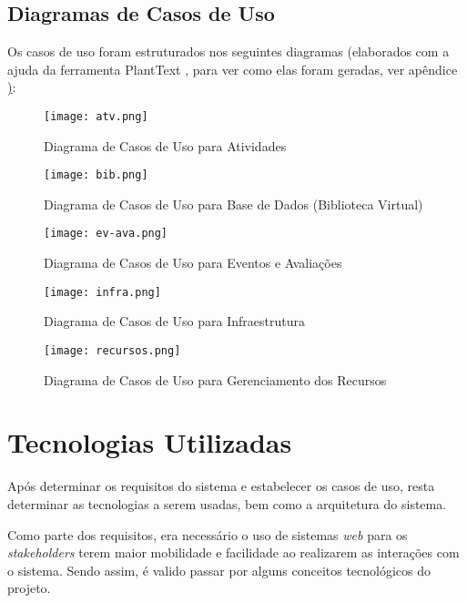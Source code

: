 \subsection{Diagramas de Casos de Uso}
Os casos de uso foram estruturados nos seguintes diagramas (elaborados com a ajuda da ferramenta PlantText \cite{planttext2018}, para ver como elas foram geradas, ver apêndice \href{chap:use-case-appendix}):

\begin{figure}[H]
    \centering
    \texttt{[image: atv.png]}
    \caption{Diagrama de Casos de Uso para Atividades}
    \label{fig:use-case-atv}
\end{figure}

\begin{figure}[H]
    \centering
    \texttt{[image: bib.png]}
    \caption{Diagrama de Casos de Uso para Base de Dados (Biblioteca Virtual)}
    \label{fig:use-case-atv}
\end{figure}

\begin{figure}[H]
    \centering
    \texttt{[image: ev-ava.png]}
    \caption{Diagrama de Casos de Uso para Eventos e Avaliações}
    \label{fig:use-case-atv}
\end{figure}

\begin{figure}[H]
    \centering
    \texttt{[image: infra.png]}
    \caption{Diagrama de Casos de Uso para Infraestrutura}
    \label{fig:use-case-atv}
\end{figure}

\begin{figure}[H]
    \centering
    \texttt{[image: recursos.png]}
    \caption{Diagrama de Casos de Uso para Gerenciamento dos Recursos}
    \label{fig:use-case-atv}
\end{figure}

\section{Tecnologias Utilizadas}
Após determinar os requisitos do sistema e estabelecer os casos de uso, resta determinar as tecnologias a serem usadas, bem como a arquitetura do sistema.

Como parte dos requisitos, era necessário o uso de sistemas \textit{web} para os \textit{stakeholders} terem maior mobilidade e facilidade ao realizarem as interações com o sistema. Sendo assim, é valido passar por alguns conceitos tecnológicos do projeto.

